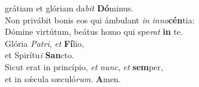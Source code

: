 \evenverse grátiam et glóriam da\textit{bit} \textbf{Dó}minus.\\
\oddverse Non privábit bonis eos qui ámbulant \textit{in} \textit{in}\textit{no}\textbf{cén}tia:~\*\\
\oddverse Dómine virtútum, beátus homo qui spe\textit{rat} \textbf{in} te.\\
\evenverse Glória \textit{Pa}\textit{tri}, \textit{et} \textbf{Fí}lio,~\*\\
\evenverse et Spirítu\textit{i} \textbf{San}cto.\\
\oddverse Sicut erat in princípio, \textit{et} \textit{nunc}, \textit{et} \textbf{sem}per,~\*\\
\oddverse et in sǽcula sæculó\textit{rum}. \textbf{A}men.\\
